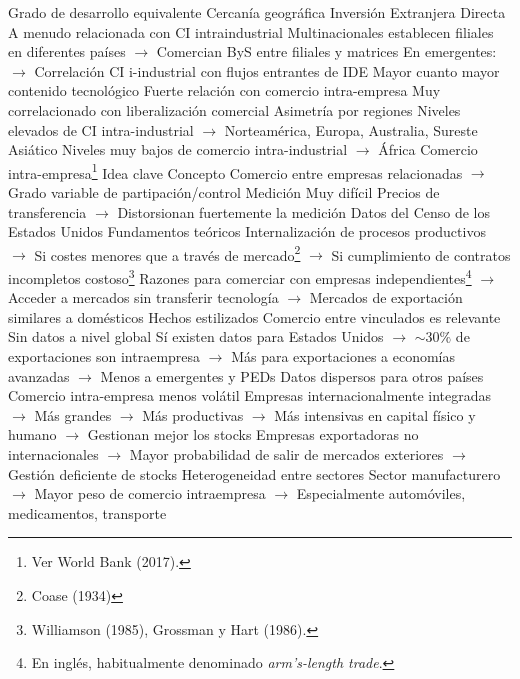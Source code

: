 \documentclass{nuevotema}
\begin{document}
\begin{esquemal}
				\4[] Grado de desarrollo equivalente
				\4[] Cercanía geográfica
				\4[ii] Inversión Extranjera Directa
				\4[] A menudo relacionada con CI intraindustrial
				\4[] Multinacionales establecen filiales en diferentes países
				\4[] $\to$ Comercian ByS entre filiales y matrices
				\4[] En emergentes:
				\4[] $\to$ Correlación CI i-industrial con flujos entrantes de IDE
				\4[iii] Mayor cuanto mayor contenido tecnológico
				\4[iv] Fuerte relación con comercio intra-empresa
				\4[v] Muy correlacionado con liberalización comercial
				\4[vi] Asimetría por regiones
				\4[] Niveles elevados de CI intra-industrial
				\4[] $\to$ Norteamérica, Europa, Australia, Sureste Asiático
				\4[] Niveles muy bajos de comercio intra-industrial
				\4[] $\to$ África
		\2 Comercio intra-empresa\footnote{Ver World Bank (2017).}
			\3 Idea clave
				\4 Concepto
				\4[] Comercio entre empresas relacionadas
				\4[] $\to$ Grado variable de partipación/control
				\4 Medición
				\4[] Muy difícil
				\4[] Precios de transferencia
				\4[] $\to$ Distorsionan fuertemente la medición
				\4[] Datos del Censo de los Estados Unidos
				\4 Fundamentos teóricos
				\4[] Internalización de procesos productivos
				\4[] $\to$ Si costes menores que a través de mercado\footnote{Coase (1934)}
				\4[] $\to$ Si cumplimiento de contratos incompletos costoso\footnote{Williamson (1985), Grossman y Hart (1986).}
				\4[] Razones para comerciar con empresas independientes\footnote{En inglés, habitualmente denominado \textit{arm's-length trade}.}
				\4[] $\to$ Acceder a mercados sin transferir tecnología
				\4[] $\to$ Mercados de exportación similares a domésticos
			\3 Hechos estilizados
				\4[i] Comercio entre vinculados es relevante
				\4[] Sin datos a nivel global
				\4[] Sí existen datos para Estados Unidos
				\4[] $\to$ $\sim 30\%$ de exportaciones son intraempresa
				\4[] $\to$ Más para exportaciones a economías avanzadas
				\4[] $\to$ Menos a emergentes y PEDs
				\4[] Datos dispersos para otros países
				\4[ii] Comercio intra-empresa menos volátil
				\4[] Empresas internacionalmente integradas
				\4[] $\to$ Más grandes
				\4[] $\to$ Más productivas
				\4[] $\to$ Más intensivas en capital físico y humano
				\4[] $\to$ Gestionan mejor los stocks
				\4[] Empresas exportadoras no internacionales
				\4[] $\to$ Mayor probabilidad de salir de mercados exteriores
				\4[] $\to$ Gestión deficiente de stocks
				\4[iii] Heterogeneidad entre sectores
				\4[] Sector manufacturero
				\4[] $\to$ Mayor peso de comercio intraempresa
				\4[] $\to$ Especialmente automóviles, medicamentos, transporte

\end{esquemal}
\end{document}
